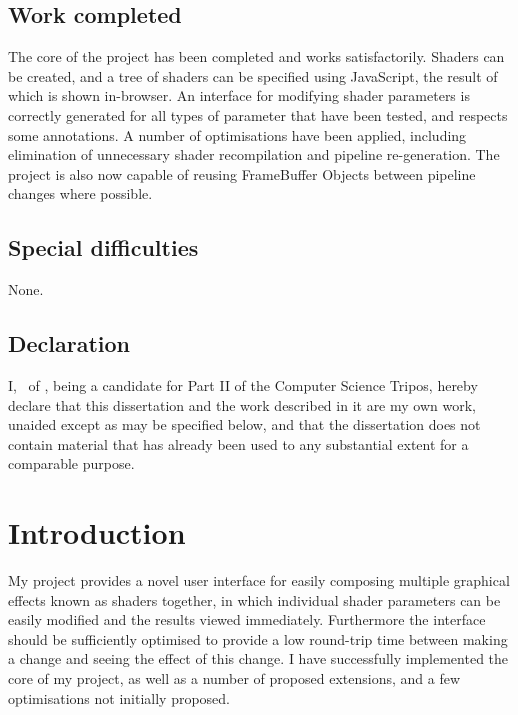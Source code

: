 \documentclass[12pt,twoside,notitlepage]{report}
\begin{document}
\section*{Work completed}
The core of the project has been completed and works satisfactorily. Shaders can be created, and a tree of shaders can be specified using JavaScript, the result of which is shown in-browser. An interface for modifying shader parameters is correctly generated for all types of parameter that have been tested, and respects some annotations. A number of optimisations have been applied, including elimination of unnecessary shader recompilation and pipeline re-generation. The project is also now capable of reusing FrameBuffer Objects between pipeline changes where possible.

\section*{Special difficulties}
None.
 
\newpage
\section*{Declaration}

I, \name \ of \college, being a candidate for Part II of the Computer
Science Tripos, hereby declare
that this dissertation and the work described in it are my own work,
unaided except as may be specified below, and that the dissertation
does not contain material that has already been used to any substantial
extent for a comparable purpose.

\bigskip
{}

\medskip
{}

\cleardoublepage

\tableofcontents


\cleardoublepage        %


\chapter{Introduction}
My project provides a novel user interface for easily composing multiple graphical effects known as shaders together, in which individual shader parameters can be easily modified and the results viewed immediately. Furthermore the interface should be sufficiently optimised to provide a low round-trip time between making a change and seeing the effect of this change. I have successfully implemented the core of my project, as well as a number of proposed extensions, and a few optimisations not initially proposed.
\end{document}
